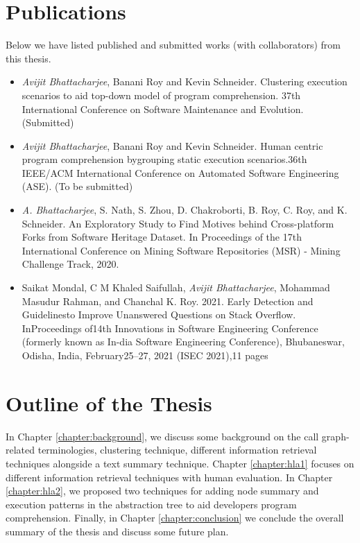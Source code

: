 
\section{Publications}

Below we have listed published and submitted works (with collaborators) from this thesis. 

\begin{itemize}
    \item \emph{Avijit Bhattacharjee}, Banani Roy and Kevin Schneider. Clustering execution scenarios to aid top-down
model of program comprehension. 37th International Conference on Software Maintenance and Evolution. (Submitted)
    \item \emph{Avijit Bhattacharjee}, Banani Roy and Kevin Schneider. Human centric program comprehension bygrouping static execution scenarios.36th IEEE/ACM International Conference on Automated Software Engineering (ASE). (To be submitted)
    \item \emph{A. Bhattacharjee}, S. Nath, S. Zhou, D. Chakroborti, B. Roy, C. Roy, and K. Schneider. An Exploratory Study to Find Motives behind Cross-platform Forks from Software Heritage Dataset. In Proceedings of the 17th International Conference on Mining Software Repositories (MSR) - Mining Challenge Track, 2020.
    \item Saikat Mondal, C M Khaled Saifullah, \emph{Avijit Bhattacharjee}, Mohammad Masudur Rahman, and Chanchal K. Roy. 2021. Early Detection and Guidelinesto Improve Unanswered Questions on Stack Overflow. InProceedings of14th Innovations in Software Engineering Conference (formerly known as In-dia Software Engineering Conference), Bhubaneswar, Odisha, India, February25–27, 2021 (ISEC 2021),11 pages
    
    
\end{itemize}

\section{Outline of the Thesis}
\label{intro:outline}

In Chapter \ref{chapter:background}, we discuss some background on the call graph-related terminologies, clustering technique, different information retrieval techniques alongside a text summary technique. Chapter \ref{chapter:hla1} focuses on different information retrieval techniques with human evaluation. In Chapter \ref{chapter:hla2}, we proposed two techniques for adding node summary and execution patterns in the abstraction tree to aid developers program comprehension. Finally, in Chapter \ref{chapter:conclusion} we conclude the overall summary of the thesis and discuss some future plan. 
